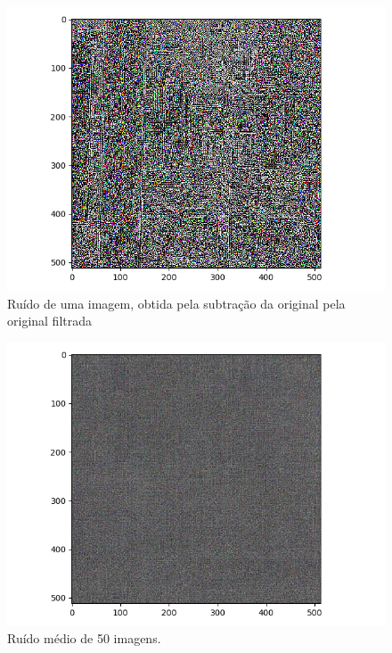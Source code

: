 \documentclass[10pt,twocolumn,letterpaper]{article}
\begin{document}
\begin{figure}
\begin{center}
	\includegraphics[width=0.99\columnwidth]{pics/ruido.png}
	\caption{Ruído de uma imagem, obtida pela subtração da original pela original filtrada
	\label{fig:ruido}}   
\end{center} 
\end{figure}  

\begin{figure}
\begin{center}
	\includegraphics[width=0.99\columnwidth]{pics/ruido_medio.png}
	\caption{Ruído médio de 50 imagens.
	\label{fig:ruidom}}   
\end{center} 
\end{figure}  
\end{document}
